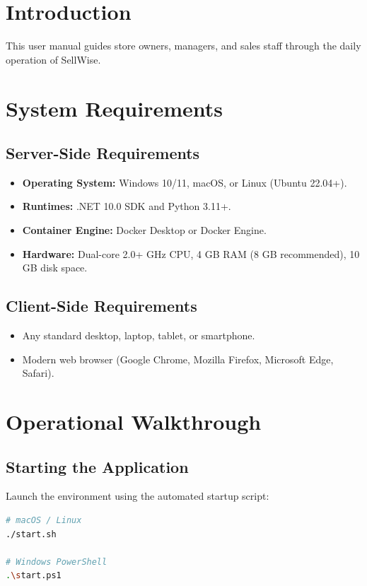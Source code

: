 \documentclass[12pt,a4paper]{report}
\begin{document}
\section{Introduction}
This user manual guides store owners, managers, and sales staff through the daily operation of SellWise.

\section{System Requirements}

\subsection{Server-Side Requirements}
\begin{itemize}
    \item \textbf{Operating System:} Windows 10/11, macOS, or Linux (Ubuntu 22.04+).
    \item \textbf{Runtimes:} .NET 10.0 SDK and Python 3.11+.
    \item \textbf{Container Engine:} Docker Desktop or Docker Engine.
    \item \textbf{Hardware:} Dual-core 2.0+ GHz CPU, 4 GB RAM (8 GB recommended), 10 GB disk space.
\end{itemize}

\subsection{Client-Side Requirements}
\begin{itemize}
    \item Any standard desktop, laptop, tablet, or smartphone.
    \item Modern web browser (Google Chrome, Mozilla Firefox, Microsoft Edge, Safari).
\end{itemize}

\section{Operational Walkthrough}

\subsection{Starting the Application}
Launch the environment using the automated startup script:
\begin{lstlisting}[language=bash]
# macOS / Linux
./start.sh

# Windows PowerShell
.\start.ps1
\end{lstlisting}
\end{document}
